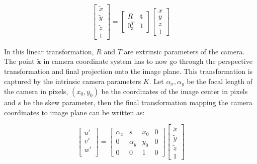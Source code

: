\documentclass[a4paper, twoside, english]{article}
\begin{document}
\begin{equation*}
 \left[
 \begin{array}{c}
  \tilde{x} \\
  \tilde{y} \\
  \tilde{z} \\
  1
 \end{array}
 \right] =
 \left[
 \begin{array}{cc}
  R & \textbf{t} \\
  0_{3}^{T} & 1  
 \end{array}
 \right]
 \left[
 \begin{array}{c}
  x \\
  y \\
  z \\
  1
 \end{array}
 \right]
 \label{eq:worldToCamera}
\end{equation*}

In this linear transformation, $R$ and $T$ are extrinsic parameters of the camera. The point $\tilde{\textbf{x}}$ in camera coordinate system has to now go through the perspective transformation and final projection onto the image plane. 
This transformation is captured by the intrinsic camera parameters $K$. Let $\alpha_{x}, \alpha_{y}$ be the focal length of the camera in pixels, $(x_0, y_0)$ be the coordinates of the image center in pixels and $s$ be the skew parameter, then the final transformation mapping the camera coordinates to image plane can be written as:

\begin{equation*}
 \left[
 \begin{array}{c}
  u' \\
  v' \\
  w' \\
 \end{array}
 \right] =
 \left[
 \begin{array}{cccc}
  \alpha_{x} & s & x_{0} & 0 \\
  0 & \alpha_{y} & y_{0} & 0 \\
  0 & 0 & 1 & 0
 \end{array}
 \right]
 \left[
 \begin{array}{c}
  \tilde{x} \\
  \tilde{y} \\
  \tilde{z} \\
  1
 \end{array}
 \right]
 \label{eq:perspectiveProjection}
\end{equation*}
\end{document}

